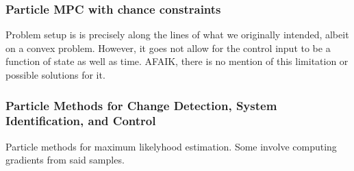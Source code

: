 \documentclass[11pt]{article}
\begin{document}
\subsubsection*{Particle MPC with chance constraints \cite{blackmore2010probabilistic}}
Problem setup is is precisely along the lines of what we originally intended, albeit on a convex problem. However, it goes not allow for the control input to be a function of state as well as time. AFAIK, there is no mention of this limitation or possible solutions for it.

\subsubsection*{Particle Methods for Change Detection, System
Identification, and Control \cite{andrieu2004particle}}
Particle methods for maximum likelyhood estimation. Some involve computing gradients from said samples.
 
\subsection*{}



\end{document}
